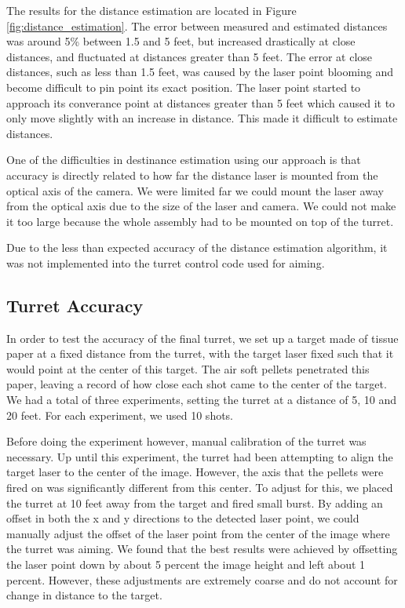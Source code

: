 \documentclass[10pt,twocolumn,letterpaper]{article}
\begin{document}
The results for the distance estimation are located in Figure \ref{fig:distance_estimation}. The error between measured and estimated distances was around 5\% between 1.5 and 5 feet, but increased drastically at close distances, and fluctuated at distances greater than 5 feet. The error at close distances, such as less than 1.5 feet, was caused by the laser point blooming and become difficult to pin point its exact position. The laser point started to approach its converance point at distances greater than 5 feet which caused it to only move slightly with an increase in distance. This made it difficult to estimate distances.

One of the difficulties in destinance estimation using our approach is that accuracy is directly related to how far the distance laser is mounted from the optical axis of the camera. We were limited far we could mount the laser away from the optical axis due to the size of the laser and camera. We could not make it too large because the whole assembly had to be mounted on top of the turret.

Due to the less than expected accuracy of the distance estimation algorithm, it was not implemented into the turret control code used for aiming.

\subsection{Turret Accuracy}

In order to test the accuracy of the final turret, we set up a target made of tissue paper at a fixed distance from the turret, with the target laser fixed such that it would point at the center of this target. The air soft pellets penetrated this paper, leaving a record of how close each shot came to the center of the target. We had a total of three experiments, setting the turret at a distance of 5, 10 and 20 feet. For each experiment, we used 10 shots.

Before doing the experiment however, manual calibration of the turret was necessary. Up until this experiment, the turret had been attempting to align the target laser to the center of the image. However, the axis that the pellets were fired on was significantly different from this center. To adjust for this, we placed the turret at 10 feet away from the target and fired small burst. By adding an offset in both the x and y directions to the detected laser point, we could manually adjust the offset of the laser point from the center of the image where the turret was aiming.  We found that the best results were achieved by offsetting the laser point down by about 5 percent the image height and left about 1 percent. However, these adjustments are extremely coarse and do not account for change in distance to the target.
\end{document}
